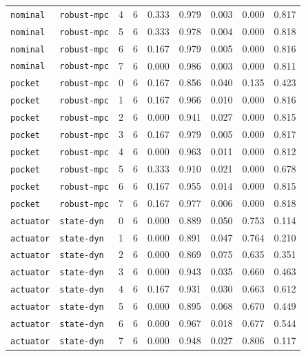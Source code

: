 \documentclass{article}
\begin{document}
\begin{center}
\begin{tabular}{lllcccccc}
\texttt{nominal} & \texttt{robust-mpc} & 4 & 6 & 0.333 & 0.979 & 0.003 & 0.000 & 0.817 \\
\texttt{nominal} & \texttt{robust-mpc} & 5 & 6 & 0.333 & 0.978 & 0.004 & 0.000 & 0.818 \\
\texttt{nominal} & \texttt{robust-mpc} & 6 & 6 & 0.167 & 0.979 & 0.005 & 0.000 & 0.816 \\
\texttt{nominal} & \texttt{robust-mpc} & 7 & 6 & 0.000 & 0.986 & 0.003 & 0.000 & 0.811 \\
\texttt{pocket} & \texttt{robust-mpc} & 0 & 6 & 0.167 & 0.856 & 0.040 & 0.135 & 0.423 \\
\texttt{pocket} & \texttt{robust-mpc} & 1 & 6 & 0.167 & 0.966 & 0.010 & 0.000 & 0.816 \\
\texttt{pocket} & \texttt{robust-mpc} & 2 & 6 & 0.000 & 0.941 & 0.027 & 0.000 & 0.815 \\
\texttt{pocket} & \texttt{robust-mpc} & 3 & 6 & 0.167 & 0.979 & 0.005 & 0.000 & 0.817 \\
\texttt{pocket} & \texttt{robust-mpc} & 4 & 6 & 0.000 & 0.963 & 0.011 & 0.000 & 0.812 \\
\texttt{pocket} & \texttt{robust-mpc} & 5 & 6 & 0.333 & 0.910 & 0.021 & 0.000 & 0.678 \\
\texttt{pocket} & \texttt{robust-mpc} & 6 & 6 & 0.167 & 0.955 & 0.014 & 0.000 & 0.815 \\
\texttt{pocket} & \texttt{robust-mpc} & 7 & 6 & 0.167 & 0.977 & 0.006 & 0.000 & 0.818 \\
\texttt{actuator} & \texttt{state-dyn} & 0 & 6 & 0.000 & 0.889 & 0.050 & 0.753 & 0.114 \\
\texttt{actuator} & \texttt{state-dyn} & 1 & 6 & 0.000 & 0.891 & 0.047 & 0.764 & 0.210 \\
\texttt{actuator} & \texttt{state-dyn} & 2 & 6 & 0.000 & 0.869 & 0.075 & 0.635 & 0.351 \\
\texttt{actuator} & \texttt{state-dyn} & 3 & 6 & 0.000 & 0.943 & 0.035 & 0.660 & 0.463 \\
\texttt{actuator} & \texttt{state-dyn} & 4 & 6 & 0.167 & 0.931 & 0.030 & 0.663 & 0.612 \\
\texttt{actuator} & \texttt{state-dyn} & 5 & 6 & 0.000 & 0.895 & 0.068 & 0.670 & 0.449 \\
\texttt{actuator} & \texttt{state-dyn} & 6 & 6 & 0.000 & 0.967 & 0.018 & 0.677 & 0.544 \\
\texttt{actuator} & \texttt{state-dyn} & 7 & 6 & 0.000 & 0.948 & 0.027 & 0.806 & 0.117 \\
\bottomrule
\end{tabular}
\end{center}
\end{document}
